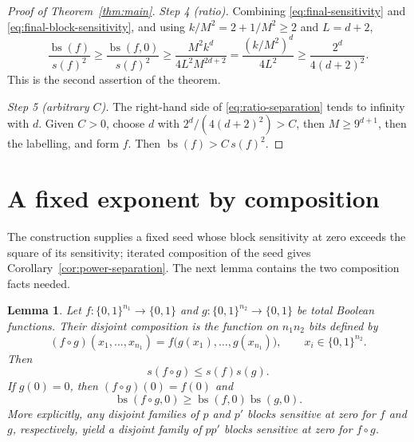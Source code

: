 \documentclass[11pt]{article}
\newcommand{\bs}{\operatorname{bs}}
\newtheorem{lemma}[theorem]{Lemma}
\theoremstyle{definition}
\theoremstyle{remark}
\begin{document}
\begin{proof}[Proof of Theorem~\ref{thm:main}]
\emph{Step 4 (ratio).} Combining \eqref{eq:final-sensitivity} and
\eqref{eq:final-block-sensitivity}, and using \(k/M^2=2+1/M^2\ge2\) and
\(L=d+2\),
\begin{equation}
\label{eq:ratio-separation}
 \frac{\bs(f)}{s(f)^2}
 \geq\frac{\bs(f,0)}{s(f)^2}
 \geq\frac{M^2k^d}{4L^2M^{2d+2}}
 =\frac{(k/M^2)^d}{4L^2}
 \geq\frac{2^d}{4(d+2)^2}.
\end{equation}
This is the second assertion of the theorem.

\emph{Step 5 (arbitrary \(C\)).} The right-hand side of
\eqref{eq:ratio-separation} tends to infinity with \(d\). Given \(C>0\),
choose \(d\) with \(2^d/(4(d+2)^2)>C\), then \(M\ge 9^{d+1}\), then the
labelling, and form \(f\). Then \(\bs(f)>C\,s(f)^2\).
\end{proof}

\section{A fixed exponent by composition}
\label{sec:composition}

The construction supplies a fixed seed whose block sensitivity at zero
exceeds the square of its sensitivity; iterated composition of the seed
gives Corollary~\ref{cor:power-separation}. The next lemma contains the two
composition facts needed.

\begin{lemma}
\label{lem:composition}
Let \(f:\{0,1\}^{n_1}\to\{0,1\}\) and
\(g:\{0,1\}^{n_2}\to\{0,1\}\) be total Boolean functions.
Their disjoint composition is the function on \(n_1n_2\) bits defined by
\[
 (f\circ g)(x_1,\ldots,x_{n_1})
   =f\bigl(g(x_1),\ldots,g(x_{n_1})\bigr),
 \qquad x_i\in\{0,1\}^{n_2}.
\]
Then
\[
 s(f\circ g)\leq s(f)s(g).
\]
If \(g(0)=0\), then \((f\circ g)(0)=f(0)\) and
\[
 \bs(f\circ g,0)\geq\bs(f,0)\bs(g,0).
\]
More explicitly, any disjoint families of \(p\) and \(p'\) blocks sensitive
at zero for \(f\) and \(g\), respectively, yield a disjoint family of
\(pp'\) blocks sensitive at zero for \(f\circ g\).
\end{lemma}
\end{document}
